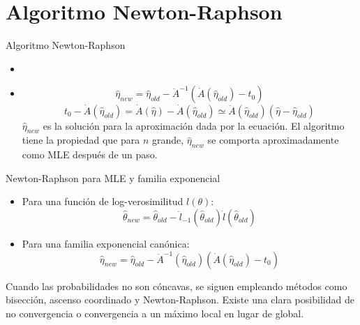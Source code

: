 \documentclass[aspectratio=169,xcolor=dvipsnames]{beamer}
\begin{document}

    \section{Algoritmo Newton-Raphson}

\begin{frame}{Algoritmo Newton-Raphson}
    \begin{itemize}
        \item {}
         \item {}
                $$\hat{\eta}_{new}=\hat{\eta}_{old}-\ddot{A}^{-1}(\Dot{A}(\hat{\eta}_{old})-t_0)$$
$$t_{0}-\Dot{A}(\hat{\eta}_{old})=\Dot{A}(\hat{\eta})-\Dot{A}(\hat{\eta}_{old})\simeq \ddot{A}(\hat{\eta}_{old})(\hat{\eta}-\hat{\eta}_{old})$$
$\hat{\eta}_{new}$ es la solución para la aproximación dada por la ecuación. El algoritmo tiene la propiedad que para $n$ grande, $\hat{\eta}_{new}$ se comporta aproximadamente como MLE después de un paso. 
    \end{itemize}
\end{frame}

\begin{frame}{Newton-Raphson para MLE y familia exponencial}
\begin{itemize}
    \item Para una función de log-verosimilitud $l(\theta)$:
    $$\hat{\theta}_{new}=\hat{\theta}_{old}-\ddot{l}_{-1}(\hat{\theta}_{old})\dot{l}(\hat{\theta}_{old})$$
    \item Para una familia exponencial canónica: 
    $$\hat{\eta}_{new}=\hat{\eta}_{old}-\ddot{A}^{-1}(\hat{\eta}_{old})(\dot{A}(\hat{\eta}_{old})-t_0)$$
\end{itemize}
Cuando las probabilidades no son cóncavas, se siguen empleando métodos como bisección, ascenso coordinado y Newton-Raphson.
Existe una clara posibilidad de no convergencia o convergencia a un máximo local en lugar de global.
\end{frame}
\end{document}
